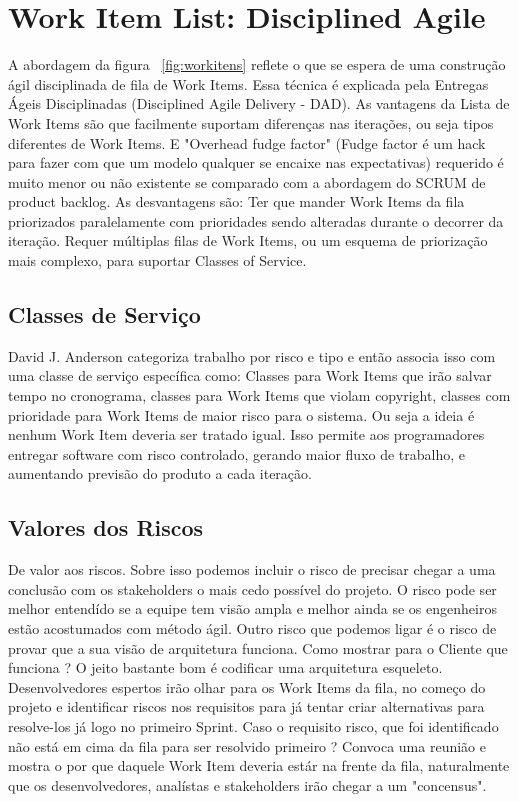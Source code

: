 \documentclass[conference]{IEEEtran}
\begin{document}
\section{Work Item List: Disciplined Agile}
A abordagem da figura ~\ref{fig:workitens} reflete o que se espera de uma construção ágil disciplinada de fila de Work Items. Essa técnica é explicada pela Entregas Ágeis Disciplinadas (Disciplined Agile Delivery - DAD). As vantagens da Lista de Work Items são que facilmente suportam diferenças nas iterações, ou seja tipos diferentes de Work Items. E "Overhead fudge factor" (Fudge factor é um hack para fazer com que um modelo qualquer se encaixe nas expectativas) requerido é muito menor ou não existente se comparado com a abordagem do SCRUM de product backlog. As desvantagens são: Ter que mander Work Items da fila priorizados paralelamente com prioridades sendo alteradas durante o decorrer da iteração. Requer múltiplas filas de Work Items, ou um esquema de priorização mais complexo, para suportar Classes of Service.

\subsection{Classes de Serviço}
David J. Anderson categoriza trabalho por risco e tipo e então associa isso com uma classe de serviço específica como: Classes para Work Items que irão salvar tempo no cronograma, classes para Work Items que violam copyright, classes com prioridade para Work Items de maior risco para o sistema. Ou seja a ideia é nenhum Work Item deveria ser tratado igual. Isso permite aos programadores entregar software com risco controlado, gerando maior fluxo de trabalho, e aumentando previsão do produto a cada iteração\cite{dpjoyce}.

\subsection{Valores dos Riscos}
De valor aos riscos. Sobre isso podemos incluir o risco de precisar chegar a uma conclusão com os stakeholders o mais cedo possível do projeto. O risco pode ser melhor entendído se a equipe tem visão ampla e melhor ainda se os engenheiros estão acostumados com método ágil. Outro risco que podemos ligar é o risco de provar que a sua visão de arquitetura funciona. Como mostrar para o Cliente que funciona ? O jeito bastante bom é codificar uma arquitetura esqueleto. Desenvolvedores espertos irão olhar para os Work Items da fila, no começo do projeto e identificar riscos nos requisitos para já tentar criar alternativas para resolve-los já logo no primeiro Sprint. Caso o requisito risco, que foi identificado não está em cima da fila para ser resolvido primeiro ? Convoca uma reunião e mostra o por que daquele Work Item deveria estár na frente da fila, naturalmente que os desenvolvedores, analístas e stakeholders irão chegar a um "concensus".
\end{document}
